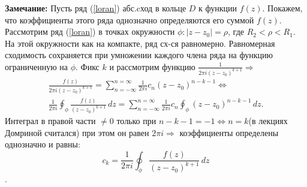 \documentclass{article}
\begin{document}
\textbf{Замечание:} Пусть ряд (\ref{loran}) абс.cход в кольце $D$ к функции $f(z)$. Покажем, что коэффициенты этого ряда однозначно определяются его суммой $f(z)$. Рассмотрим ряд (\ref{loran}) в точках окружности $\phi: |z-z_0|=\rho$, где $R_2<\rho<R_1$. На этой окружности как на компакте, ряд сх-ся равномерно. Равномерная сходимость сохраняется при умножении каждого члена ряда на функцию ограниченную на $\phi$. Фикс $k$ и рассмотрим функцию $\frac{1}{2\pi i(z-z_0)^{k+1}} \Rightarrow$ 
\begin{equation*}
\begin{gathered}
 \frac{f(z)}{2\pi i(z-z_0)^{k+1}} = \sum_{n=-\infty}^{n=\infty}\frac{1}{2\pi i}c_n(z-z_0)^{n-k-1} \Longleftrightarrow
 \\
 \frac{1}{2\pi i} \oint_\phi \frac{f(z)}{(z-z_0)^{k+1}} \,dz = \sum_{n=-\infty}^{n=\infty}\frac{1}{2\pi i}c_n\oint_\phi(z-z_0)^{n-k-1} \,dz. 
\end{gathered}
\end{equation*}
Интеграл в правой части $\neq0$ только при $n-k-1=-1 \Longleftrightarrow n=k$(в лекциях Домриной считался) при этом он равен $2\pi i \Rightarrow$ коэффициенты определены однозначно и равны: $$c_k = \frac{1}{2\pi i} \oint_\phi \frac{f(z)}{(z-z_0)^{k+1}} \,dz$$.
\end{document}
